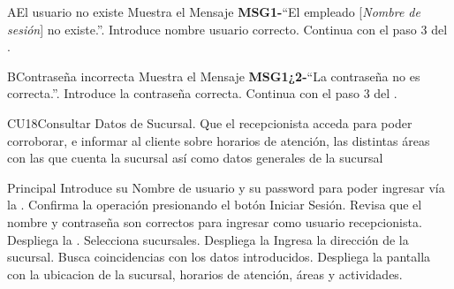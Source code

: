 		\begin{UCtrayectoriaA}{A}{El usuario no existe}
			\UCpaso[\UCactor] Muestra el Mensaje {\bf MSG1-}``El empleado [{\em Nombre de sesión}] no existe.''.
			\UCpaso[\UCactor] Introduce nombre usuario correcto.
			\UCpaso[] Continua con el paso 3 del .
		\end{UCtrayectoriaA}
		
		\begin{UCtrayectoriaA}{B}{Contraseña incorrecta}
			\UCpaso Muestra el Mensaje {\bf MSG1¿2-}``La contraseña no es correcta.''.
			\UCpaso[\UCactor] Introduce la contraseña correcta.
			\UCpaso[] Continua con el paso 3 del .
		\end{UCtrayectoriaA}


		

\begin{UseCase}{CU18}{Consultar Datos de Sucursal.}{
			Que el recepcionista acceda para poder corroborar, e informar al cliente sobre horarios de atención, las distintas áreas con
las que cuenta la sucursal así como datos generales de la sucursal}
	\end{UseCase}
	\begin{UCtrayectoria}{Principal}
		\UCpaso[\UCactor] Introduce su Nombre de usuario y su password para poder ingresar vía la  \label{CU1LoginJI}.
		\UCpaso[\UCactor] Confirma la operación presionando el botón Iniciar Sesión.
		\UCpaso Revisa que el nombre y contraseña son correctos para ingresar como usuario recepcionista.
		\UCpaso Despliega la .
		\UCpaso[\UCactor]Selecciona sucursales.
		\UCpaso Despliega la 
		\UCpaso[\UCactor]Ingresa la dirección de la sucursal.
		\UCpaso Busca coincidencias con los datos introducidos.
		\UCpaso Despliega la pantalla con la ubicacion de la sucursal, horarios de atención, áreas y actividades.

	\end{UCtrayectoria}

